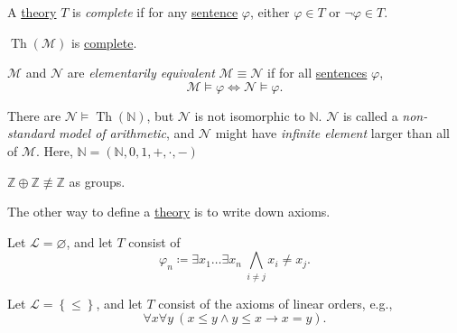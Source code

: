 \begin{definition}[Complete]\label{def:theory-complete}
	A \hyperref[def:theory]{theory} \(T\) is \emph{complete} if for any \hyperref[def:sentence]{sentence} \(\varphi \), either \(\varphi \in T\) or \(\lnot \varphi \in T\).
\end{definition}

\begin{remark}
	\(\mathop{\mathrm{Th}}(\mathcal{M} ) \) is \hyperref[def:theory-complete]{complete}.
\end{remark}

\begin{definition}\label{def:elementarily-equivalent}
	\(\mathcal{M} \) and \(\mathcal{N} \) are \emph{elementarily equivalent} \(\mathcal{M} \equiv \mathcal{N} \) if for all \hyperref[def:sentence]{sentences} \(\varphi \),
	\[
		\mathcal{M} \models \varphi \iff \mathcal{N} \models \varphi .
	\]
\end{definition}

\begin{remark}\label{rmk:non-standard-model-of-arithmetic}
	There are \(\mathcal{N} \models \mathop{\mathrm{Th}}(\mathbb{N})\), but \(\mathcal{N} \) is not isomorphic to \(\mathbb{N} \). \(\mathcal{N} \) is called a \emph{non-standard model of arithmetic}, and \(\mathcal{N} \) might have \emph{infinite element} larger than all of \(\mathcal{M} \). Here, \(\mathbb{N} =(\mathbb{N} , 0, 1, +, \cdot, - )\)
\end{remark}

\begin{eg}
	\(\mathbb{Z} \oplus \mathbb{Z} \not\equiv \mathbb{Z} \) as groups.
\end{eg}

The other way to define a \hyperref[def:theory]{theory} is to write down axioms.

\begin{eg}
	Let \(\mathcal{L} = \varnothing \), and let \(T\) consist of
	\[
		\varphi _n \coloneqq \exists x_1 \dots \exists x_n\ \bigwedge _{i \neq j} x_i \neq x_j.
	\]
\end{eg}

\begin{eg}
	Let \(\mathcal{L} =\left\{ \leq \right\} \), and let \(T\) consist of the axioms of linear orders, e.g.,
	\[
		\forall x\forall y\ (x \leq y \land y \leq x \to x=y).
	\]
\end{eg}

